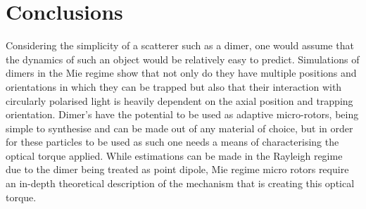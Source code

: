 \section{Conclusions}
Considering the simplicity of a scatterer such as a dimer,
one would assume that the dynamics of such an object would be
relatively easy to predict. Simulations of dimers in the Mie regime
show that not only do they have multiple positions and orientations 
in which they can be trapped but also that their interaction
with circularly polarised light is heavily dependent on the axial 
position and trapping orientation. Dimer's have the potential to be used
as adaptive micro-rotors, being simple to synthesise and can be made 
out of any material of choice, but in order for these particles to be
used as such one needs a means of characterising the optical torque
applied. While estimations can be made in the Rayleigh regime due to 
the dimer being treated as point dipole, Mie regime micro rotors require 
an in-depth theoretical description of the mechanism that is creating 
this optical torque. 
